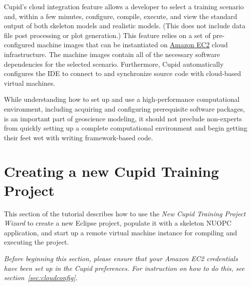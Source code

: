 \documentclass[oneside,11pt]{memoir}
\begin{document}
Cupid's cloud integration feature allows a developer to select a training scenario and, within a few minutes, configure, compile, execute, and view the standard output of both skeleton models and realistic models. (This does not include data file post processing or plot generation.) This feature relies on a set of pre-configured machine images that can be instantiated on \href{http://aws.amazon.com/ec2/}{Amazon EC2} cloud infrastructure. The machine images contain all of the necessary software dependencies for the selected scenario. Furthermore, Cupid automatically configures the IDE to connect to and synchronize source code with cloud-based virtual machines.

While understanding how to set up and use a high-performance computational environment, including acquiring and configuring prerequisite software packages, is an important part of geoscience modeling, it should not preclude non-experts from quickly setting up a complete computational environment and begin getting their feet wet with writing framework-based code.

\section{Creating a new Cupid Training Project}
\label{sec:cupidwizard}

This section of the tutorial describes how to use the \emph{New Cupid Training Project Wizard} to create a new Eclipse project, populate it with a skeleton NUOPC application, and start up a remote virtual machine instance for compiling and executing the project.

\emph{Before beginning this section, please ensure that your Amazon EC2 credentials have been set up in the Cupid preferences. For instruction on how to do this, see section~\ref{sec:cloudconfig}.}
\end{document}
